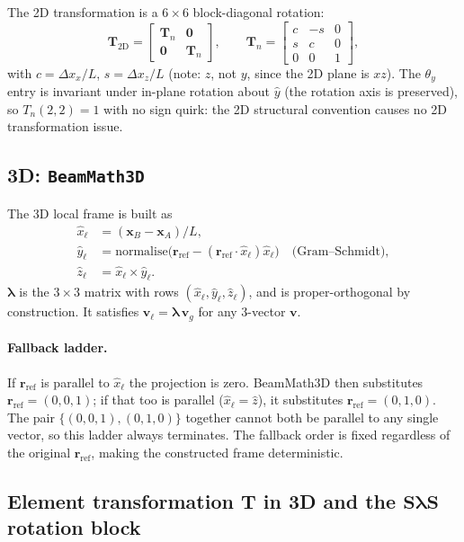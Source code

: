 \documentclass[11pt,a4paper]{book}
\newcommand{\bmath}[1]{\boldsymbol{#1}}
\newcommand{\yhat}{\hat{y}}
\newcommand{\zhat}{\hat{z}}
\newcommand{\xhatl}{\hat{x}_\ell}
\newcommand{\yhatl}{\hat{y}_\ell}
\newcommand{\zhatl}{\hat{z}_\ell}
\newcommand{\Sdiag}{\bmath{S}}
\newcommand{\lam}{\bmath{\lambda}}
\begin{document}
The 2D transformation is a $6\times 6$ block-diagonal rotation:
\[
\bmath{T}_{\text{2D}} = \begin{bmatrix} \bmath{T}_n & \bmath{0} \\ \bmath{0} & \bmath{T}_n \end{bmatrix},
\qquad
\bmath{T}_n = \begin{bmatrix} c & -s & 0 \\ s & c & 0 \\ 0 & 0 & 1 \end{bmatrix},
\]
with $c = \Delta x_x / L$, $s = \Delta x_z / L$ (note: $z$, not $y$, since the 2D plane is $xz$). The $\theta_y$ entry is invariant under in-plane rotation about $\yhat$ (the rotation axis is preserved), so $T_n(2,2) = 1$ with no sign quirk: the 2D structural convention causes no 2D transformation issue.

\subsection{3D: \texttt{BeamMath3D}}

The 3D local frame is built as
\begin{align*}
\xhatl &= (\bmath{x}_B - \bmath{x}_A)/L, \\
\yhatl &= \mathrm{normalise}\bigl(\bmath{r}_{\text{ref}} - (\bmath{r}_{\text{ref}}\cdot\xhatl)\xhatl\bigr) \quad \text{(Gram--Schmidt)}, \\
\zhatl &= \xhatl \times \yhatl.
\end{align*}
$\lam$ is the $3\times 3$ matrix with rows $(\xhatl, \yhatl, \zhatl)$, and is proper-orthogonal by construction. It satisfies $\bmath{v}_\ell = \lam\,\bmath{v}_g$ for any 3-vector $\bmath{v}$.

\paragraph{Fallback ladder.} If $\bmath{r}_{\text{ref}}$ is parallel to $\xhatl$ the projection is zero. BeamMath3D then substitutes $\bmath{r}_{\text{ref}} = (0,0,1)$; if that too is parallel ($\xhatl = \zhat$), it substitutes $\bmath{r}_{\text{ref}} = (0,1,0)$. The pair $\{(0,0,1), (0,1,0)\}$ together cannot both be parallel to any single vector, so this ladder always terminates. The fallback order is fixed regardless of the original $\bmath{r}_{\text{ref}}$, making the constructed frame deterministic.

\subsection{Element transformation \texorpdfstring{$\bmath{T}$}{T} in 3D and the \texorpdfstring{$\Sdiag\lam\Sdiag$}{S lambda S} rotation block}\label{sec:slambdaSlambdaS}
\end{document}
